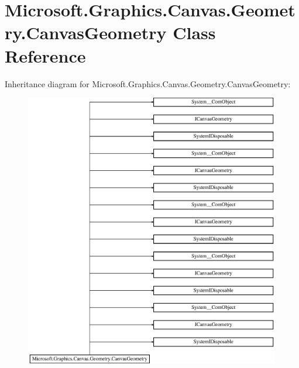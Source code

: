 \hypertarget{class_microsoft_1_1_graphics_1_1_canvas_1_1_geometry_1_1_canvas_geometry}{}\section{Microsoft.\+Graphics.\+Canvas.\+Geometry.\+Canvas\+Geometry Class Reference}
\label{class_microsoft_1_1_graphics_1_1_canvas_1_1_geometry_1_1_canvas_geometry}
Inheritance diagram for Microsoft.\+Graphics.\+Canvas.\+Geometry.\+Canvas\+Geometry\+:\begin{figure}[H]
\begin{center}
\leavevmode
\includegraphics[height=12.000000cm]{class_microsoft_1_1_graphics_1_1_canvas_1_1_geometry_1_1_canvas_geometry}
\end{center}
\end{figure}
